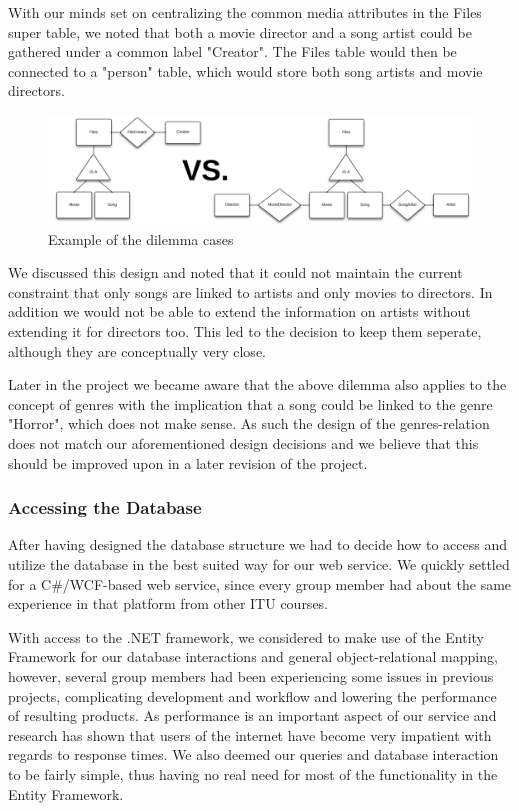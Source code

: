 With our minds set on centralizing the common media attributes in the Files super table, we noted that both a movie director and a song artist could be gathered under a common label "Creator". The Files table would then be connected to a "person" table, which would store both song artists and movie directors.
\begin{figure}[hbt]
	\centering
	\centerline{\includegraphics[scale=0.52]{./p1design/dilemma.png}}
	\caption{Example of the dilemma cases}
	\label{fig:erddilemma}
\end{figure}

We discussed this design and noted that it could not maintain the current constraint that only songs are linked to artists and only movies to directors. In addition we would not be able to extend the information on artists without extending it for directors too. This led to the decision to keep them seperate, although they are conceptually very close.

Later in the project we became aware that the above dilemma also applies to the concept of genres with the implication that a song could be linked to the genre "Horror", which does not make sense. As such the design of the genres-relation does not match our aforementioned design decisions and we believe that this should be improved upon in a later revision of the project.

\subsubsection{Accessing the Database}
\label{sec:databaseaccess}
After having designed the database structure we had to decide how to access and utilize the database in the best suited way for our web service. We quickly settled for a C\#/WCF-based web service, since every group member had about the same experience in that platform from other ITU courses.

With access to the .NET framework, we considered to make use of the Entity Framework for our database interactions and general object-relational mapping, however, several group members had been experiencing some issues in previous projects, complicating development and workflow and lowering the performance of resulting products. As performance is an important aspect of our service and research has shown that users of the internet have become very impatient with regards to response times\cite{webusersflee}. We also deemed our queries and database interaction to be fairly simple, thus having no real need for most of the functionality in the Entity Framework.

